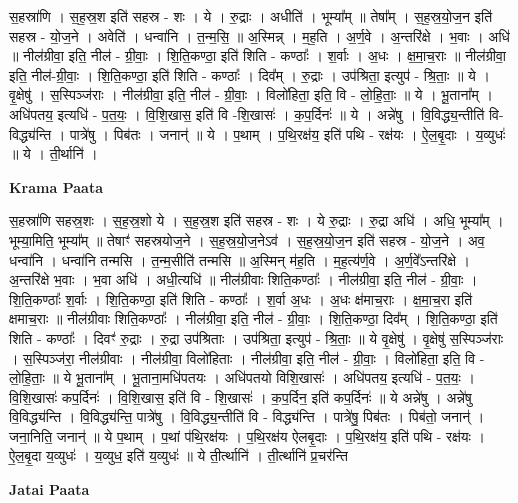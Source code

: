 \documentclass[17pt]{extarticle}
\begin{document}
स॒हस्रा॑णि । स॒ह॒स्र॒श इति॑ सहस्र - शः । ये । रु॒द्राः । अधीति॑ । भूम्या᳚म् ॥ तेषा᳚म् । स॒ह॒स्र॒यो॒ज॒न इति॑ सहस्र - यो॒ज॒ने । अवेति॑ । धन्वा॑नि । त॒न्म॒सि॒ ॥ अ॒स्मिन्न् । म॒ह॒ति । अ॒र्ण॒वे । अ॒न्तरि॑क्षे । भ॒वाः । अधि॑ ॥ नील॑ग्रीवा॒ इति॒ नील॑ - ग्री॒वाः॒ । शि॒ति॒कण्ठा॒ इति॑ शिति - कण्ठाः᳚ । श॒र्वाः । अ॒धः । क्ष॒मा॒च॒राः ॥ नील॑ग्रीवा॒ इति॒ नील॑-ग्री॒वाः॒ । शि॒ति॒कण्ठा॒ इति॑ शिति - कण्ठाः᳚ । दिव᳚म् । रु॒द्राः । उप॑श्रिता॒ इत्युप॑ - श्रि॒ताः॒ ॥ ये । वृ॒क्षेषु॑ । स॒स्पिञ्ज॑राः । नील॑ग्रीवा॒ इति॒ नील॑ - ग्री॒वाः॒ । विलो॑हिता॒ इति॒ वि - लो॒हि॒ताः॒ ॥ ये । भू॒ताना᳚म् । अधि॑पतय॒ इत्यधि॑ - प॒त॒यः॒ । वि॒शि॒खास॒ इति॑ वि -शि॒खासः॑ । क॒प॒र्दिनः॑ ॥ ये । अन्ने॑षु । वि॒विद्ध्य॒न्तीति॑ वि-विद्ध्य॑न्ति । पात्रे॑षु । पिब॑तः । जनान्॑ ॥ ये । प॒थाम् । प॒थि॒रक्ष॑य॒ इति॑ पथि - रक्ष॑यः । ऐ॒ल॒बृ॒दाः । य॒व्युधः॑ ॥ ये । ती॒र्थानि॑ ।  \newline


\textbf{Krama Paata} \newline

स॒हस्रा॑णि सहस्र॒शः । स॒ह॒स्र॒शो ये । स॒ह॒स्र॒श इति॑ सहस्र - शः । ये रु॒द्राः । रु॒द्रा अधि॑ । अधि॒ भूम्या᳚म् । भूम्या॒मिति॒ भूम्या᳚म् ॥ तेषाꣳ॑ सहस्रयोज॒ने । स॒ह॒स्र॒यो॒ज॒नेऽव॑ । स॒ह॒स्र॒यो॒ज॒न इति॑ सहस्र - यो॒ज॒ने । अव॒ धन्वा॑नि । धन्वा॑नि तन्मसि । त॒न्म॒सीति॑ तन्मसि ॥ अ॒स्मिन् म॑ह॒ति । म॒ह॒त्य॑र्ण॒वे । 
अ॒र्ण॒वे᳚ऽन्तरि॑क्षे । अ॒न्तरि॑क्षे भ॒वाः । भ॒वा अधि॑ । अधी॒त्यधि॑ ॥ नील॑ग्रीवाः शिति॒कण्ठाः᳚ । नील॑ग्रीवा॒ इति॒ नील॑ - ग्री॒वाः॒ । शि॒ति॒कण्ठाः᳚ श॒र्वाः । शि॒ति॒कण्ठा॒ इति॑ शिति - कण्ठाः᳚ । श॒र्वा अ॒धः । अ॒धः क्ष॑माच॒राः । क्ष॒मा॒च॒रा इति॑ क्षमाच॒राः ॥ नील॑ग्रीवाः शिति॒कण्ठाः᳚ । नील॑ग्रीवा॒ इति॒ नील॑ - ग्री॒वाः॒ । शि॒ति॒कण्ठा॒ दिव᳚म् । शि॒ति॒कण्ठा॒ इति॑ शिति - कण्ठाः᳚ । दिवꣳ॑ रु॒द्राः । रु॒द्रा उप॑श्रिताः । उप॑श्रिता॒ इत्युप॑ - श्रि॒ताः॒ ॥ ये वृ॒क्षेषु॑ । वृ॒क्षेषु॑ स॒स्पिञ्ज॑राः । स॒स्पिञ्ज॑रा॒ नील॑ग्रीवाः । नील॑ग्रीवा॒ विलो॑हिताः । नील॑ग्रीवा॒ इति॒ नील॑ - ग्री॒वाः॒ । विलो॑हिता॒ इति॒ वि - लो॒हि॒ताः॒ ॥ ये भू॒ताना᳚म् । भू॒ताना॒मधि॑पतयः । अधि॑पतयो विशि॒खासः॑ । अधि॑पतय॒ इत्यधि॑ - प॒त॒यः॒ । वि॒शि॒खासः॑ कप॒र्दिनः॑ । वि॒शि॒खास॒ इति॑ वि - शि॒खासः॑ । क॒प॒र्दिन॒ इति॑ कप॒र्दिनः॑ ॥ ये अन्ने॑षु । अन्ने॑षु वि॒विद्ध्य॑न्ति । वि॒विद्ध्य॑न्ति॒ पात्रे॑षु । वि॒विद्ध्य॒न्तीति॑ वि - विद्ध्य॑न्ति । पात्रे॑षु॒ पिब॑तः । पिब॑तो॒ जनान्॑ । जना॒निति॒ जनान्॑ ॥ ये प॒थाम् । प॒थां प॑थि॒रक्ष॑यः । प॒थि॒रक्ष॑य ऐलबृ॒दाः । प॒थि॒रक्ष॑य॒ इति॑ पथि - रक्ष॑यः । ऐ॒ल॒बृ॒दा य॒व्युधः॑ । य॒व्युध॒ इति॑ य॒व्युधः॑ ॥ ये ती॒र्त्थानि॑ । ती॒र्त्थानि॑ प्र॒चर॑न्ति \newline

\textbf{Jatai Paata} \newline
\end{document}
